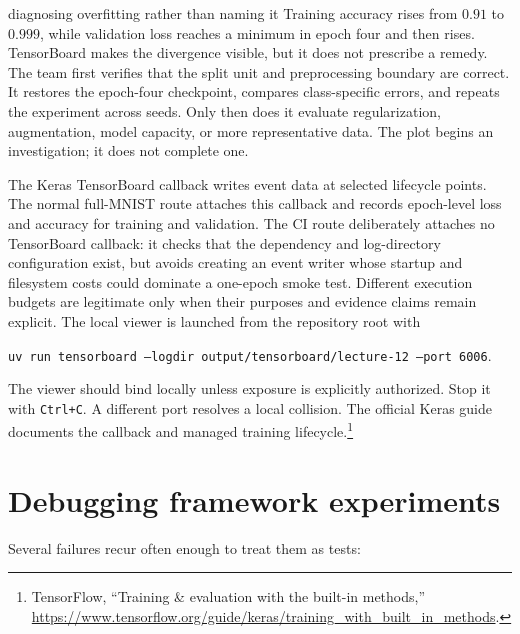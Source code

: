 \begin{workedexample}{diagnosing overfitting rather than naming it}
Training accuracy rises from $0.91$ to $0.999$, while validation loss reaches a
minimum in epoch four and then rises. TensorBoard makes the divergence visible,
but it does not prescribe a remedy. The team first verifies that the split unit
and preprocessing boundary are correct. It restores the epoch-four checkpoint,
compares class-specific errors, and repeats the experiment across seeds. Only
then does it evaluate regularization, augmentation, model capacity, or more
representative data. The plot begins an investigation; it does not complete one.
\end{workedexample}

The Keras TensorBoard callback writes event data at selected lifecycle points.
The normal full-MNIST route attaches this callback and records epoch-level loss
and accuracy for training and validation. The CI route deliberately attaches
no TensorBoard callback: it checks that the dependency and log-directory
configuration exist, but avoids creating an event writer whose startup and
filesystem costs could dominate a one-epoch smoke test. Different execution
budgets are legitimate only when their purposes and evidence claims remain
explicit.
The local viewer is launched from the repository root with
\begin{center}
\texttt{uv run tensorboard --logdir output/tensorboard/lecture-12 --port 6006}.
\end{center}
The viewer should bind locally unless exposure is explicitly authorized. Stop
it with \texttt{Ctrl+C}. A different port resolves a local collision. The
official Keras guide documents the callback and managed training lifecycle.\footnote{
TensorFlow, ``Training \& evaluation with the built-in methods,''
\url{https://www.tensorflow.org/guide/keras/training_with_built_in_methods}.}

\section{Debugging framework experiments}

Several failures recur often enough to treat them as tests:

